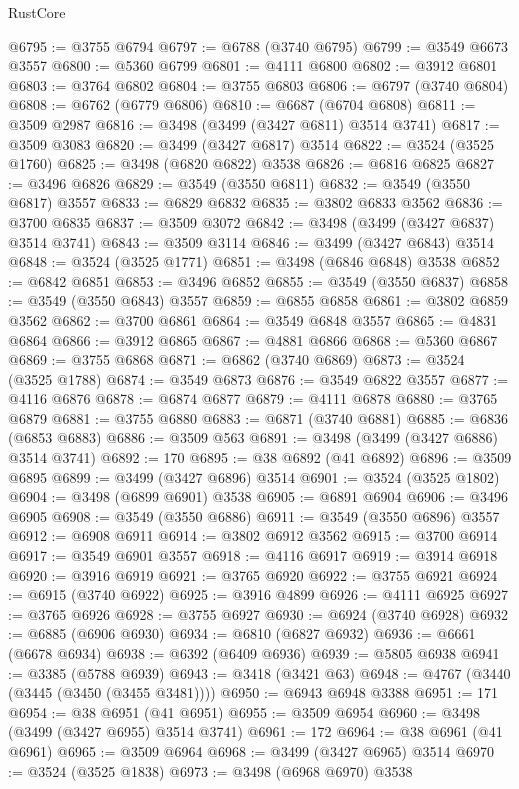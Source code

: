 \begin{lexlean}{RustCore}
\begin{coremodule}
@6795 := @3755 @6794
@6797 := @6788 (@3740 @6795)
@6799 := @3549 @6673 @3557
@6800 := @5360 @6799
@6801 := @4111 @6800
@6802 := @3912 @6801
@6803 := @3764 @6802
@6804 := @3755 @6803
@6806 := @6797 (@3740 @6804)
@6808 := @6762 (@6779 @6806)
@6810 := @6687 (@6704 @6808)
@6811 := @3509 @2987
@6816 := @3498 (@3499 (@3427 @6811) @3514 @3741)
@6817 := @3509 @3083
@6820 := @3499 (@3427 @6817) @3514
@6822 := @3524 (@3525 @1760)
@6825 := @3498 (@6820 @6822) @3538
@6826 := @6816 @6825
@6827 := @3496 @6826
@6829 := @3549 (@3550 @6811)
@6832 := @3549 (@3550 @6817) @3557
@6833 := @6829 @6832
@6835 := @3802 @6833 @3562
@6836 := @3700 @6835
@6837 := @3509 @3072
@6842 := @3498 (@3499 (@3427 @6837) @3514 @3741)
@6843 := @3509 @3114
@6846 := @3499 (@3427 @6843) @3514
@6848 := @3524 (@3525 @1771)
@6851 := @3498 (@6846 @6848) @3538
@6852 := @6842 @6851
@6853 := @3496 @6852
@6855 := @3549 (@3550 @6837)
@6858 := @3549 (@3550 @6843) @3557
@6859 := @6855 @6858
@6861 := @3802 @6859 @3562
@6862 := @3700 @6861
@6864 := @3549 @6848 @3557
@6865 := @4831 @6864
@6866 := @3912 @6865
@6867 := @4881 @6866
@6868 := @5360 @6867
@6869 := @3755 @6868
@6871 := @6862 (@3740 @6869)
@6873 := @3524 (@3525 @1788)
@6874 := @3549 @6873
@6876 := @3549 @6822 @3557
@6877 := @4116 @6876
@6878 := @6874 @6877
@6879 := @4111 @6878
@6880 := @3765 @6879
@6881 := @3755 @6880
@6883 := @6871 (@3740 @6881)
@6885 := @6836 (@6853 @6883)
@6886 := @3509 @563
@6891 := @3498 (@3499 (@3427 @6886) @3514 @3741)
@6892 := 170
@6895 := @38 @6892 (@41 @6892)
@6896 := @3509 @6895
@6899 := @3499 (@3427 @6896) @3514
@6901 := @3524 (@3525 @1802)
@6904 := @3498 (@6899 @6901) @3538
@6905 := @6891 @6904
@6906 := @3496 @6905
@6908 := @3549 (@3550 @6886)
@6911 := @3549 (@3550 @6896) @3557
@6912 := @6908 @6911
@6914 := @3802 @6912 @3562
@6915 := @3700 @6914
@6917 := @3549 @6901 @3557
@6918 := @4116 @6917
@6919 := @3914 @6918
@6920 := @3916 @6919
@6921 := @3765 @6920
@6922 := @3755 @6921
@6924 := @6915 (@3740 @6922)
@6925 := @3916 @4899
@6926 := @4111 @6925
@6927 := @3765 @6926
@6928 := @3755 @6927
@6930 := @6924 (@3740 @6928)
@6932 := @6885 (@6906 @6930)
@6934 := @6810 (@6827 @6932)
@6936 := @6661 (@6678 @6934)
@6938 := @6392 (@6409 @6936)
@6939 := @5805 @6938
@6941 := @3385 (@5788 @6939)
@6943 := @3418 (@3421 @63)
@6948 := @4767 (@3440 (@3445 (@3450 (@3455 @3481))))
@6950 := @6943 @6948 @3388
@6951 := 171
@6954 := @38 @6951 (@41 @6951)
@6955 := @3509 @6954
@6960 := @3498 (@3499 (@3427 @6955) @3514 @3741)
@6961 := 172
@6964 := @38 @6961 (@41 @6961)
@6965 := @3509 @6964
@6968 := @3499 (@3427 @6965) @3514
@6970 := @3524 (@3525 @1838)
@6973 := @3498 (@6968 @6970) @3538

\end{coremodule}
\end{lexlean}
